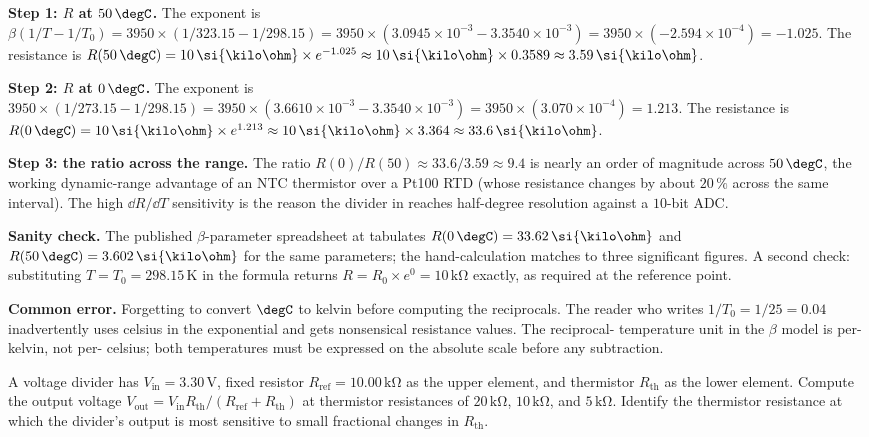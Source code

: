 \textbf{Step 1: $R$ at $50 \,\degC$.} The exponent is
$\beta(1/T - 1/T_{0}) = 3950 \times (1/323.15 - 1/298.15) = 3950
\times (3.0945 \times 10^{-3} - 3.3540 \times 10^{-3}) = 3950
\times (-2.594 \times 10^{-4}) = -1.025$. The resistance is
$R(50 \,\degC) = 10 \,\si{\kilo\ohm} \times e^{-1.025} \approx 10
\,\si{\kilo\ohm} \times 0.3589 \approx 3.59 \,\si{\kilo\ohm}$.

\textbf{Step 2: $R$ at $0 \,\degC$.} The exponent is $3950 \times
(1/273.15 - 1/298.15) = 3950 \times (3.6610 \times 10^{-3} -
3.3540 \times 10^{-3}) = 3950 \times (3.070 \times 10^{-4}) = 1.213$.
The resistance is $R(0 \,\degC) = 10 \,\si{\kilo\ohm} \times
e^{1.213} \approx 10 \,\si{\kilo\ohm} \times 3.364 \approx 33.6
\,\si{\kilo\ohm}$.

\textbf{Step 3: the ratio across the range.} The ratio $R(0)/R(50)
\approx 33.6 / 3.59 \approx 9.4$ is nearly an order of magnitude
across $50 \,\degC$, the working dynamic-range advantage of an
NTC thermistor over a Pt100 RTD (whose resistance changes by
about $20\,\%$ across the same interval). The high $\dd R/\dd T$
sensitivity is the reason the divider in
 reaches half-degree
resolution against a $10$-bit ADC.

\textbf{Sanity check.} The published $\beta$-parameter
spreadsheet at 
tabulates $R(0 \,\degC) = 33.62 \,\si{\kilo\ohm}$ and $R(50 \,
\degC) = 3.602 \,\si{\kilo\ohm}$ for the same parameters; the
hand-calculation matches to three significant figures. A second
check: substituting $T = T_{0} = 298.15 \,\si{\kelvin}$ in the
formula returns $R = R_{0} \times e^{0} = 10 \,\si{\kilo\ohm}$
exactly, as required at the reference point.

\textbf{Common error.} Forgetting to convert $\degC$ to kelvin
before computing the reciprocals. The reader who writes
$1/T_{0} = 1/25 = 0.04$ inadvertently uses celsius in the
exponential and gets nonsensical resistance values. The reciprocal-
temperature unit in the $\beta$ model is per-kelvin, not per-
celsius; both temperatures must be expressed on the absolute scale
before any subtraction.

\begin{exercise}
A voltage divider has $V_{\text{in}} = 3.30 \,\si{\volt}$, fixed
resistor $R_{\text{ref}} = 10.00 \,\si{\kilo\ohm}$ as the upper
element, and thermistor $R_{\text{th}}$ as the lower element.
Compute the output voltage
$V_{\text{out}} = V_{\text{in}} R_{\text{th}} / (R_{\text{ref}} +
R_{\text{th}})$ at thermistor resistances of $20 \,\si{\kilo\ohm}$,
$10 \,\si{\kilo\ohm}$, and $5 \,\si{\kilo\ohm}$. Identify the
thermistor resistance at which the divider's output is most
sensitive to small fractional changes in $R_{\text{th}}$.
\end{exercise}

